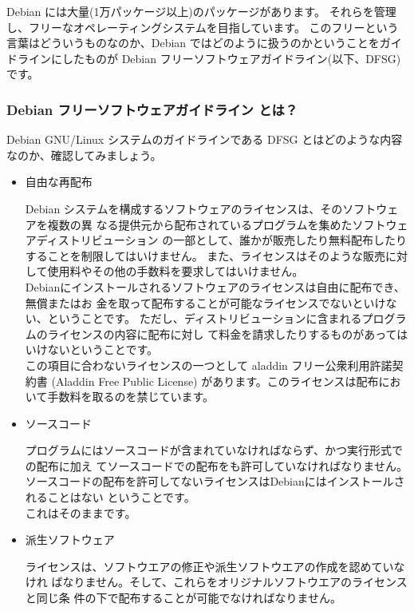 \documentclass[mingoth,a4paper]{jsarticle}
\begin{document}
Debian には大量(1万パッケージ以上)のパッケージがあります。
それらを管理し、フリーなオペレーティングシステムを目指しています。
このフリーという言葉はどういうものなのか、Debian ではどのように扱うのかということをガイドラインにしたものが Debian フリーソフトウェアガイドライン(以下、DFSG) です。
 
\subsubsection{Debian フリーソフトウェアガイドライン とは？}

Debian GNU/Linux システムのガイドラインである DFSG とはどのような内容なのか、確認してみましょう。

\begin{itemize}
 \item 自由な再配布

Debian システムを構成するソフトウェアのライセンスは、そのソフトウェアを複数の異
なる提供元から配布されているプログラムを集めたソフトウェアディストリビューション
の一部として、誰かが販売したり無料配布したりすることを制限してはいけません。
また、ライセンスはそのような販売に対して使用料やその他の手数料を要求してはいけません。
\\

Debianにインストールされるソフトウェアのライセンスは自由に配布でき、無償またはお
金を取って配布することが可能なライセンスでないといけない、ということです。
ただし、ディストリビューションに含まれるプログラムのライセンスの内容に配布に対し
て料金を請求したりするものがあってはいけないということです。
\\

この項目に合わないライセンスの一つとして aladdin フリー公衆利用許諾契約書 (Aladdin Free Public License)
があります。このライセンスは配布において手数料を取るのを禁じています。
	  
 \item ソースコード

プログラムにはソースコードが含まれていなければならず、かつ実行形式での配布に加え
てソースコードでの配布をも許可していなければなりません。
\\

ソースコードの配布を許可してないライセンスはDebianにはインストールされることはない
ということです。
\\

これはそのままです。
	  
 \item 派生ソフトウェア

ライセンスは、ソフトウエアの修正や派生ソフトウエアの作成を認めていなけれ
ばなりません。そして、これらをオリジナルソフトウエアのライセンスと同じ条
件の下で配布することが可能でなければなりません。
\\


\end{itemize}
\end{document}
